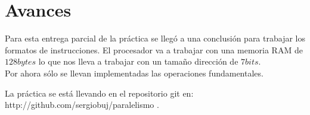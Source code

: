\documentclass[%
	final,
	notitlepage,
	narroweqnarray,
	inline,
	twoside,
	]{ieee}
\begin{document}
\section{Avances}

Para esta entrega parcial de la práctica se llegó a una conclusión para trabajar los formatos de instrucciones.
El procesador va a trabajar con una memoria RAM de $128 bytes$ lo que nos lleva a trabajar con un tamaño
dirección de $7 bits$.\\

Por ahora sólo se llevan implementadas las operaciones fundamentales.

La práctica se está llevando en el repositorio git en: http://github.com/sergiobuj/paralelismo .\\ \\
\end{document}
